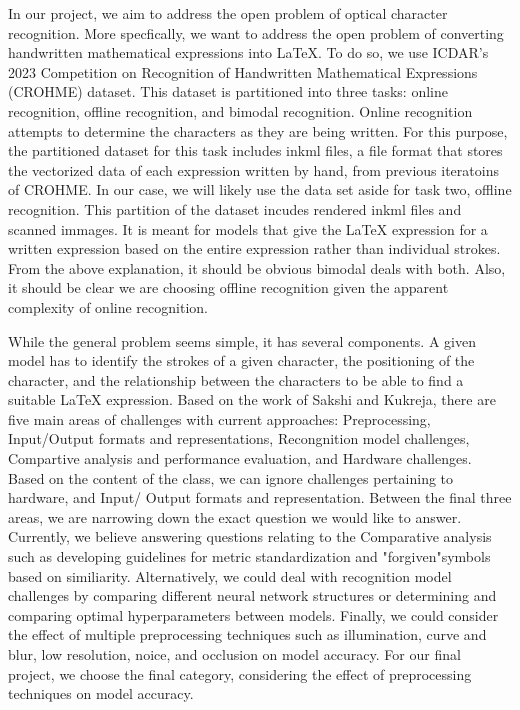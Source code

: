 \documentclass[../proposal.tex]{subfiles}
\begin{document}
\indent In our project, we aim to address the open problem of optical character recognition. More specfically, we want to address the open problem of converting handwritten mathematical expressions into LaTeX. To do so, we use ICDAR's 2023 Competition on Recognition of Handwritten Mathematical Expressions (CROHME) dataset. This dataset is partitioned into three tasks: online recognition, offline recognition, and bimodal recognition. Online recognition attempts to determine the characters as they are being written. For this purpose, the partitioned dataset for this task includes inkml files, a file format that stores the vectorized data of each expression written by hand, from previous iteratoins of CROHME\@.\cite{Xie_2023_CROHME} In our case, we will likely use the data set aside for task two, offline recognition. This partition of the dataset incudes rendered inkml files and scanned immages. It is meant for models that give the LaTeX expression for a written expression based on the entire expression rather than individual strokes. From the above explanation, it should be obvious bimodal deals with both. Also, it should be clear we are choosing offline recognition given the apparent complexity of online recognition.

\indent While the general problem seems simple, it has several components. A given model has to identify the strokes of a given character, the positioning of the character, and the relationship between the characters to be able to find a suitable LaTeX expression. Based on the work of Sakshi and Kukreja, there are five main areas of challenges with current approaches: Preprocessing, Input/Output formats and representations, Recongnition model challenges, Compartive analysis and performance evaluation, and Hardware challenges. \cite{Sakshi_2023_whiteGrey} Based on the content of the class, we can ignore challenges pertaining to hardware, and Input/ Output formats and representation. Between the final three areas, we are narrowing down the exact question we would like to answer. Currently, we believe answering questions relating to the Comparative analysis such as developing guidelines for metric standardization and "forgiven"symbols based on similiarity. Alternatively, we could deal with recognition model challenges by comparing different neural network structures or determining and comparing optimal hyperparameters between models. Finally, we could consider the effect of multiple preprocessing techniques such as illumination, curve and blur, low resolution, noice, and occlusion on model accuracy. For our final project, we choose the final category, considering the effect of preprocessing techniques on model accuracy.
\end{document}
